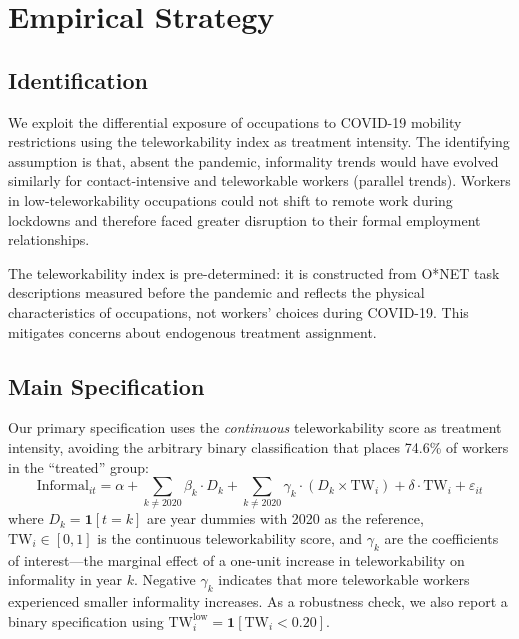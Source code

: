 \section{Empirical Strategy}
\label{sec:strategy}

\subsection{Identification}

We exploit the differential exposure of occupations to COVID-19 mobility restrictions using the \citet{dingel2020} teleworkability index as treatment intensity. The identifying assumption is that, absent the pandemic, informality trends would have evolved similarly for contact-intensive and teleworkable workers (parallel trends). Workers in low-teleworkability occupations could not shift to remote work during lockdowns and therefore faced greater disruption to their formal employment relationships.

The teleworkability index is pre-determined: it is constructed from O*NET task descriptions measured before the pandemic and reflects the physical characteristics of occupations, not workers' choices during COVID-19. This mitigates concerns about endogenous treatment assignment.

\subsection{Main Specification}

Our primary specification uses the \textit{continuous} teleworkability score as treatment intensity, avoiding the arbitrary binary classification that places 74.6\% of workers in the ``treated'' group:
\begin{equation}
    \text{Informal}_{it} = \alpha + \sum_{k \neq 2020} \beta_k \cdot D_k + \sum_{k \neq 2020} \gamma_k \cdot (D_k \times \text{TW}_i) + \delta \cdot \text{TW}_i + \varepsilon_{it}
    \label{eq:did}
\end{equation}
where $D_k = \mathbf{1}[t = k]$ are year dummies with 2020 as the reference, $\text{TW}_i \in [0, 1]$ is the continuous teleworkability score, and $\gamma_k$ are the coefficients of interest---the marginal effect of a one-unit increase in teleworkability on informality in year $k$. Negative $\gamma_k$ indicates that more teleworkable workers experienced smaller informality increases. As a robustness check, we also report a binary specification using $\text{TW}^{\text{low}}_i = \mathbf{1}[\text{TW}_i < 0.20]$.

